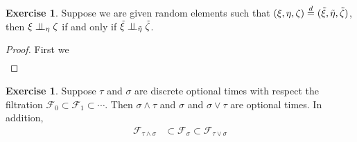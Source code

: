 \documentclass{amsart}
\theoremstyle{remark}
\theoremstyle{definition}
\newtheorem{ex}[thm]{Exercise}
\begin{document}
\begin{ex}Suppose we are given random elements such that $(\xi, \eta,
  \zeta) \overset{d}= (\tilde{\xi}, \tilde{\eta}, \tilde{\zeta})$, then
  $\xi \perp \! \! \! \perp_{\eta} \zeta$ if and only if $\tilde{\xi} \perp \! \! \! \perp_{\tilde{\eta}} \tilde{\zeta}$.
\end{ex}
\begin{proof}
First we 
\begin{align*}
\
\end{align*}
\end{proof}


\begin{ex}Suppose $\tau$ and $\sigma$ are discrete optional
  times with respect the filtration $\mathcal{F}_0 \subset
  \mathcal{F}_1 \subset \cdots$. Then $\sigma \wedge \tau$ and
  $\sigma$ and $\sigma \vee \tau$ are optional times.  In addition, 
\begin{align*}
\mathcal{F}_{\tau \wedge
    \sigma} &\subset \mathcal{F}_\sigma \subset \mathcal{F}_{\tau \vee
    \sigma}
\end{align*}
\end{ex}
\end{document}
